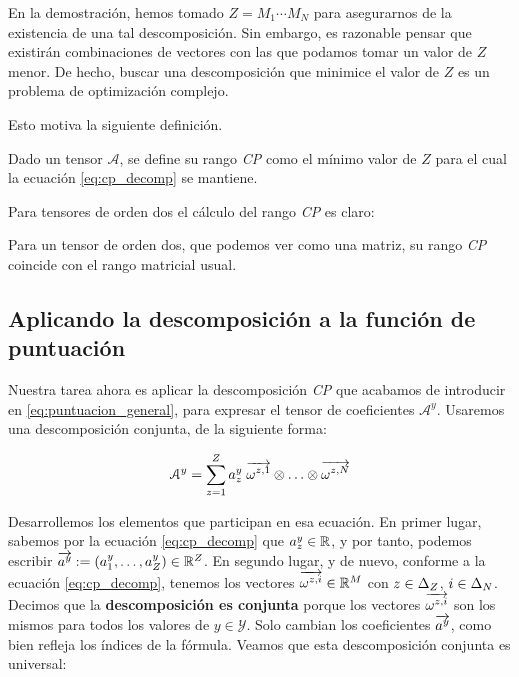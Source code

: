 \begin{observacion}

	En la demostración, hemos tomado $Z = M_1 \cdots M_N$ para asegurarnos de la existencia de una tal descomposición. Sin embargo, es razonable pensar que existirán combinaciones de vectores con las que podamos tomar un valor de $Z$ menor. De hecho, buscar una descomposición que minimice el valor de $Z$ es un problema de optimización complejo.

	Esto motiva la siguiente definición.
\end{observacion}

\begin{definicion}
	Dado un tensor $\mathcal{A}$, se define su rango \textit{CP} como el mínimo valor de $Z$ para el cual la ecuación \eqref{eq:cp_decomp} se mantiene.

\end{definicion}

Para tensores de orden dos el cálculo del rango \textit{CP} es claro:

\begin{proposicion}
	Para un tensor de orden dos, que podemos ver como una matriz, su rango \textit{CP} coincide con el rango matricial usual.
\end{proposicion}

\subsection{Aplicando la descomposición a la función de puntuación}

Nuestra tarea ahora es aplicar la descomposición \textit{CP} que acabamos de introducir en \eqref{eq:puntuacion_general}, para expresar el tensor de coeficientes $\mathcal{A}^y$. Usaremos una descomposición conjunta, de la siguiente forma:

\begin{equation} \label{eq:cp_decomp_conjunta}
	\mathcal{A}^y = \sum_{z = 1}^Z a_z^y \; \overrightarrow{\omega^{z, 1}} \otimes \ldots \otimes \overrightarrow{\omega^{z, N}}
\end{equation}

Desarrollemos los elementos que participan en esa ecuación. En primer lugar, sabemos por la ecuación \eqref{eq:cp_decomp} que $a_z^y \in \mathbb{R}$, y por tanto, podemos escribir $\overrightarrow{a^y} := (a_1^y, \ldots, a_Z^y) \in \mathbb{R}^Z$. En segundo lugar, y de nuevo, conforme a la ecuación \eqref{eq:cp_decomp}, tenemos los vectores $\overrightarrow{\omega^{z, i}} \in \mathbb{R}^M$ con $z \in \Delta_{Z}$, $i \in \Delta_{N}$. Decimos que la \textbf{descomposición es conjunta} porque los vectores $\overrightarrow{\omega^{z, i}}$ son los mismos para todos los valores de $y \in \mathcal{Y}$. Solo cambian los coeficientes $\overrightarrow{a^y}$, como bien refleja los índices de la fórmula. Veamos que esta descomposición conjunta es universal:

